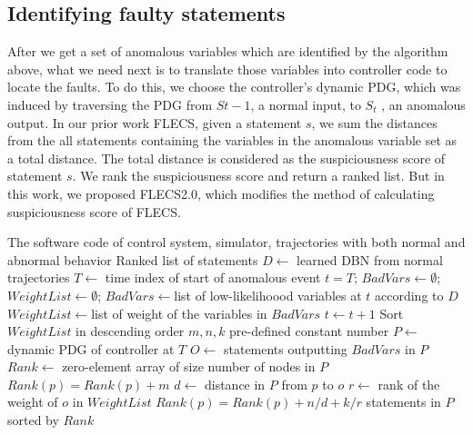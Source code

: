 \subsection{Identifying faulty statements}
After we get a set of anomalous variables which are identified by the algorithm above, what we need next is to translate those variables into controller code to locate the faults. To do this, we choose the controller’s dynamic PDG, which was induced by traversing the PDG from $S{t-1}$, a normal input, to $S_t$ , an anomalous output. In our prior work FLECS, given a statement $s$, we sum the distances from the all statements containing the variables in the anomalous variable set as a total distance. The total distance is considered as the suspiciousness score of statement $s$. We rank the suspiciousness score and return a ranked list. But in this work, we proposed FLECS2.0, which modifies the method of calculating suspiciousness score of FLECS. 

\renewcommand{\algorithmicrequire}{\textbf{Input:}}
\renewcommand{\algorithmicensure}{\textbf{Output:}}
\begin{algorithm}
  \label{flecs2.0}
  \begin{algorithmic}[1]
    \Require The software code of control system, simulator, trajectories with both normal and abnormal behavior
    \Ensure Ranked list of statements
    \State $D\leftarrow$ learned DBN from normal trajectories
    \State $T\leftarrow$ time index of start of anomalous event
    \State $t=T$; $BadVars\leftarrow \emptyset$; $WeightList\leftarrow \emptyset$; 
    	\State $BadVars\leftarrow$list of low-likelihoood variables at $t$ according to $D$
	\State $WeightList\leftarrow$list of weight of the variables in $BadVars$
	\State $t \leftarrow t+1$
    \EndWhile
    \State Sort $WeightList$ in descending order
    \State $m, n, k$ pre-defined constant number
    \State $P\leftarrow$ dynamic PDG of controller at $T$
    \State $O\leftarrow$ statements outputting $BadVars$ in $P$
    \State $Rank\leftarrow$ zero-element array of size number of nodes in $P$  
            		\State $Rank(p)=Rank(p)+m$
			\State $d \leftarrow$ distance in $P$ from $p$ to $o$
			\State $r \leftarrow$ rank of the weight of $o$ in $WeightList$
            		\State $Rank(p)=Rank(p)+n/d+k/r$
        		\EndIf
   	    \EndFor
    \EndFor
    \Return statements in $P$ sorted by $Rank$
  \end{algorithmic}
\end{algorithm}


